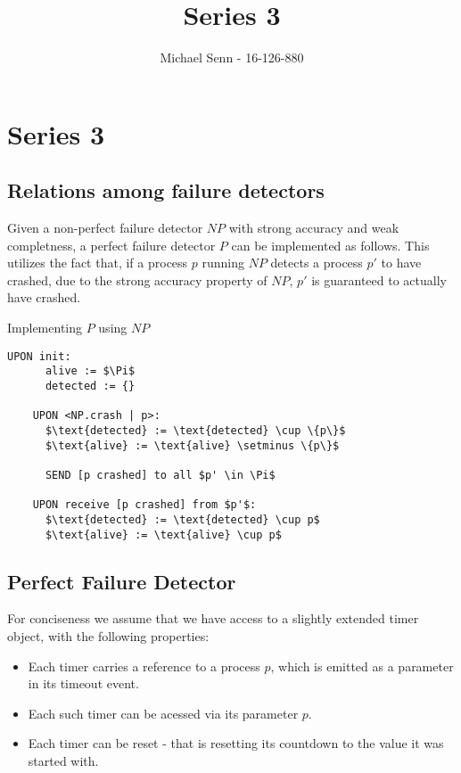 \documentclass[a4paper]{scrreprt}
\title{Series 3}
\author{Michael Senn \maillink{michael.senn@students.unibe.ch} - 16-126-880}
\date{\printdate}
\begin{document}
\maketitle


\setcounter{chapter}{2}

\chapter{Series 3}

\section{Relations among failure detectors}

Given a non-perfect failure detector $NP$ with strong accuracy and weak
completness, a perfect failure detector $P$ can be implemented as follows. This
utilizes the fact that, if a process $p$ running $NP$ detects a process $p'$ to
have crashed, due to the strong accuracy property of $NP$, $p'$ is guaranteed
to actually have crashed.

\begin{library}{Implementing $P$ using $NP$}
  \begin{lstlisting}[mathescape=true,autogobble=true,breaklines=true]
    UPON init:
      alive := $\Pi$
      detected := {}

    UPON <NP.crash | p>:
      $\text{detected} := \text{detected} \cup \{p\}$
      $\text{alive} := \text{alive} \setminus \{p\}$

      SEND [p crashed] to all $p' \in \Pi$

    UPON receive [p crashed] from $p'$:
      $\text{detected} := \text{detected} \cup p$
      $\text{alive} := \text{alive} \cup p$
  \end{lstlisting}
\end{library}

\section{Perfect Failure Detector}

For conciseness we assume that we have access to a slightly extended timer
object, with the following properties:
\begin{itemize}
  \item Each timer carries a reference to a process $p$, which is emitted as a
    parameter in its timeout event.
  \item Each such timer can be acessed via its parameter $p$.
  \item Each timer can be reset - that is resetting its countdown to the value
    it was started with.
\end{itemize}
\end{document}
